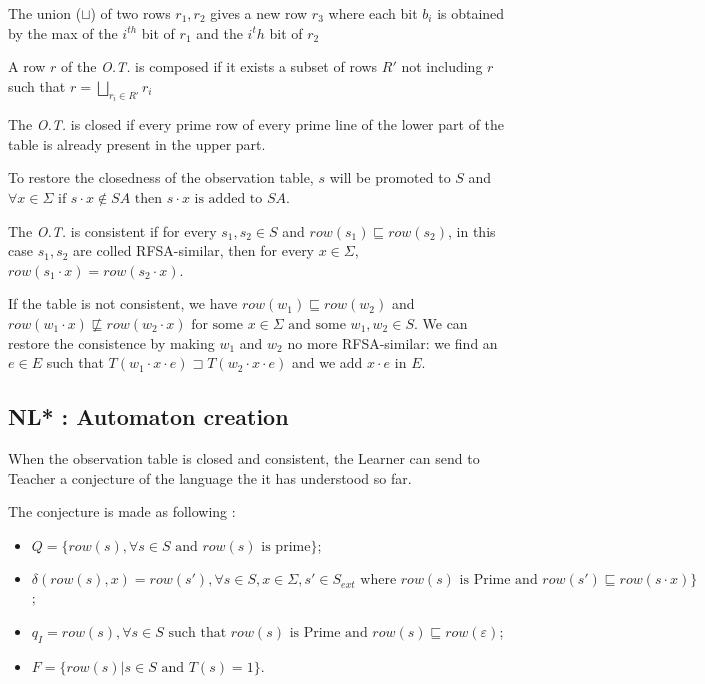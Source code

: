\begin{definition}
  The union ($\sqcup$) of two rows $r_1, r_2$ gives a new row $r_3$ where each bit $b_i$ is obtained by the max of the $i^{th}$ bit of $r_1$ and the $i^th$ bit of $r_2$
\end{definition}

\begin{definition}
  A row $r$ of the \textit{O.T.} is composed if it exists a subset of rows $R'$ not including $r$ such that $r = \bigsqcup_{r_i \in R'}r_i$
\end{definition}

\begin{definition}[Closedness]
  The \textit{O.T.} is closed if every prime row of every prime line of the lower part of the table is already present in the upper part.
\end{definition}

To restore the closedness of the observation table, $s$ will be promoted to $S$ and $\forall x \in \Sigma \text{ if } s \cdot x \notin SA \text{ then } s \cdot x \text{ is added to } SA$.

\begin{definition}[Consistence]
  The \textit{O.T.} is consistent if for every $s_1,s_2 \in S$ and $row(s_1) \sqsubseteq row(s_2)$, in this case $s_1,s_2$ are colled RFSA-similar, then for every $x \in \Sigma$, $row(s_1 \cdot x) = row(s_2 \cdot x)$.
\end{definition}

If the table is not consistent, we have $row(w_1) \sqsubseteq row(w_2)$ and $row(w_1 \cdot x) \not\sqsubseteq row(w_2 \cdot x) \text{ for some } x \in \Sigma \text{ and some }w_1, w_2 \in S$. We can restore the consistence by making $w_1$ and $w_2$ no more RFSA-similar: we find an $e \in E$ such that $T(w_1 \cdot x \cdot e) \sqsupset T(w_2 \cdot x \cdot e)$ and we add $x \cdot e$ in $E$.

\subsection{NL* : Automaton creation}

When the observation table is closed and consistent, the Learner can send to Teacher a conjecture of the language the it has understood so far.

The conjecture is made as following :
\begin{itemize}
  \item $Q = \{row(s), \forall s \in S \text{ and } row(s) \text{ is  prime} \}$;
  \item $\delta(row(s), x) = row(s'), \forall s \in S, x \in \Sigma, s' \in S_{ext} \text{ where } row(s) \text{ is Prime and } row(s') \sqsubseteq row(s \cdot x)\}$;
  \item $q_I = row(s), \forall s \in S \text{ such that } row(s) \text{ is Prime and } row(s) \sqsubseteq row(\varepsilon) $;
  \item $F = \{row(s) | s \in S \text{ and } T(s) = 1 \}$.
\end{itemize}

